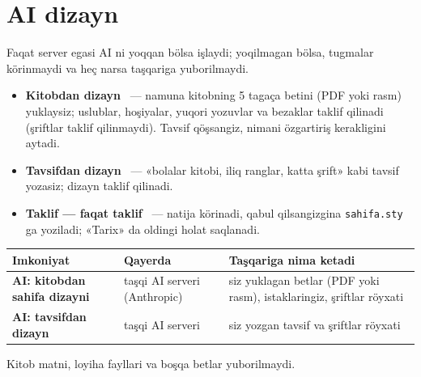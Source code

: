 \section{AI dizayn}\label{sec:sd-ai}
Faqat server egasi AI ni yoqqan bölsa işlaydi; yoqilmagan bölsa, tugmalar körinmaydi va heç narsa taşqariga yuborilmaydi. \beta
\begin{itemize}
\item \textbf{Kitobdan dizayn} \beta\ --- namuna kitobning 5 tagaça betini (PDF yoki rasm) yuklaysiz; uslublar, hoşiyalar, yuqori yozuvlar va bezaklar taklif qilinadi (şriftlar taklif qilinmaydi). Tavsif qöşsangiz, nimani özgartiriş kerakligini aytadi.
\item \textbf{Tavsifdan dizayn} \beta\ --- «bolalar kitobi, iliq ranglar, katta şrift» kabi tavsif yozasiz; dizayn taklif qilinadi.
\item \textbf{Taklif --- faqat taklif} \beta\ --- natija körinadi, qabul qilsangizgina \texttt{sahifa.sty} ga yoziladi; «Tarix» da oldingi holat saqlanadi.
\end{itemize}
\begin{center}\footnotesize
\begin{tabularx}{\linewidth}{>{\bfseries}p{40mm}p{40mm}X}
\toprule
Imkoniyat & Qayerda & Taşqariga nima ketadi\\
\midrule
AI: kitobdan sahifa dizayni & taşqi AI serveri (Anthropic) & siz yuklagan betlar (PDF yoki rasm), istaklaringiz, şriftlar röyxati\\
AI: tavsifdan dizayn & taşqi AI serveri & siz yozgan tavsif va şriftlar röyxati\\
\bottomrule
\end{tabularx}
\end{center}
Kitob matni, loyiha fayllari va boşqa betlar yuborilmaydi.
